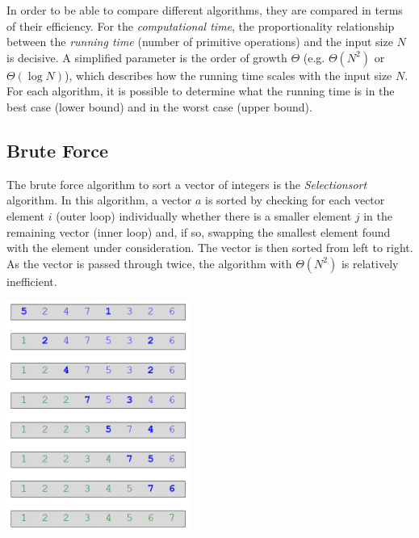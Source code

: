 

In order to be able to compare different algorithms, they are compared in terms of their efficiency. For the \emph{computational time}, the proportionality relationship between the \emph{running time} (number of primitive operations) and the input size $N$ is decisive. A simplified parameter is the order of growth $\Theta$ (e.g. $\Theta(N^2)$ or $\Theta(\log N)$), which describes how the running time scales with the input size $N$. For each algorithm, it is possible to determine what the running time is in the best case (lower bound) and in the worst case (upper bound).

\subsection{Brute Force}


The brute force algorithm to sort a vector of integers is the \emph{Selectionsort} algorithm. In this algorithm, a vector $a$ is sorted by checking for each vector element $i$ (outer loop) individually whether there is a smaller element $j$ in the remaining vector (inner loop) and, if so, swapping the smallest element found with the element under consideration. The vector is then sorted from left to right. As the vector is passed through twice, the algorithm with $\Theta(N^2)$ is relatively inefficient.

\begin{center}\includegraphics[width=0.45\textwidth]{img/algorithms/BruteForceSelectionsort.png}\end{center}

